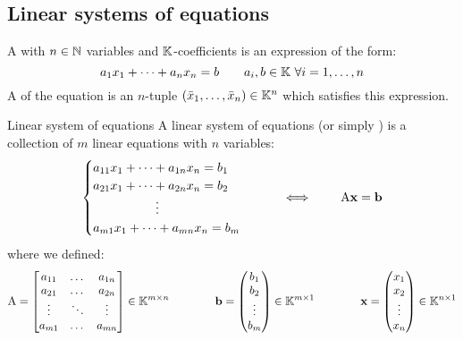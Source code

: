 \subsection{Linear systems of equations}

A  with $ n \in \mathbb{N} $ variables and $ \mathbb{K} $-coefficients is an expression of the form:
\begin{equation*}
  a_1 x_1 + \dots + a_n x_n = b
  \qquad
  a_i , b \in \mathbb{K} \,\,\forall i = 1, \dots, n
\end{equation*}
A  of the equation is an $ n $-tuple $ (\bar{x}_1, \dots, \bar{x}_n) \in \mathbb{K}^n $ which satisfies this expression.

\begin{definition}{Linear system of equations}{}
  A linear system of equations (or simply ) is a collection of $ m $ linear equations with $ n $ variables:
  \begin{equation*}
    \begin{cases}
      a_{11} x_1 + \dots + a_{1n} x_n = b_1 \\
      a_{21} x_1 + \dots + a_{2n} x_n = b_2 \\
      \qquad \qquad \quad \vdots \\
      a_{m1} x_1 + \dots + a_{mn} x_n = b_m \\
    \end{cases}
    \qquad \iff \qquad
    \mathrm{A} \mathbf{x} = \mathbf{b}
  \end{equation*}
  where we defined:
  \begin{equation*}
    \mathrm{A} =
    \begin{bmatrix}
      a_{11} & \dots & a_{1n} \\
      a_{21} & \dots & a_{2n} \\
      \vdots & \ddots & \vdots \\
      a_{m1} & \dots & a_{mn}
    \end{bmatrix}
    \in \mathbb{K}^{m \times n}
    \qquad \qquad
    \mathbf{b} =
    \begin{pmatrix}
      b_1 \\ b_2 \\ \vdots \\ b_m
    \end{pmatrix}
    \in \mathbb{K}^{m \times 1}
    \qquad \qquad
    \mathbf{x} =
    \begin{pmatrix}
      x_1 \\ x_2 \\ \vdots \\ x_n
    \end{pmatrix}
    \in \mathbb{K}^{n \times 1}
  \end{equation*}
\end{definition}

